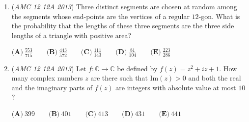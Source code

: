 \begin{enumerate}
 $\textbf{(A)} \ 15 \qquad \textbf{(B)} \ 17 \qquad \textbf{(C)} \ 19 \qquad \textbf{(D)} \ 21 \qquad \textbf{(E)} \ 23$


	\item (\textit{AMC 12 12A 2013}) Three distinct segments are chosen at random among the segments whose end-points are the vertices of a regular $12$-gon. What is the probability that the lengths of these three segments are the three side lengths of a triangle with positive area?


 $\textbf{(A)} \ \frac{553}{715} \qquad \textbf{(B)} \ \frac{443}{572} \qquad \textbf{(C)} \ \frac{111}{143} \qquad \textbf{(D)} \ \frac{81}{104} \qquad \textbf{(E)} \ \frac{223}{286}$


	\item (\textit{AMC 12 12A 2013}) Let $f : \mathbb{C} \to \mathbb{C}$ be defined by $f(z) = z^2 + iz + 1$. How many complex numbers $z$ are there such that $\text{Im}(z) > 0$ and both the real and the imaginary parts of $f(z)$ are integers with absolute value at most $10$?


 $\textbf{(A)} \ 399 \qquad \textbf{(B)} \ 401 \qquad \textbf{(C)} \ 413 \qquad \textbf{(D)} \ 431 \qquad \textbf{(E)} \ 441$


\end{enumerate}